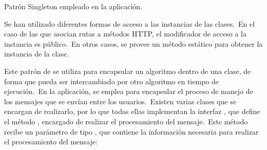 \begin{umlDiagram}
	\centering
	\scalebox{0.8} {
	}

	\caption{Patrón Singleton empleado en la aplicación.}
\end{umlDiagram}

Se han utilizado diferentes formas de acceso a las instancias de las clases.\ En el caso de las que asocian
rutas a métodos HTTP, el modificador de acceso a la instancia es público.\ En otros casos, se provee un método
estático para obtener la instancia de la clase.

Este patrón de  se utiliza para encapsular un algoritmo dentro de una clase, de forma que
pueda ser intercambiado por otro algoritmo en tiempo de ejecución.\ En la aplicación, se emplea para encapsular el
proceso de manejo de los mensajes que se envían entre los usuarios.\ Existen varias clases que se encargan de
realizarlo, por lo que todas ellas implementan la interfaz , que define el método
, encargado de realizar el procesamiento del mensaje.\ Este método recibe un
parámetro de tipo , que contiene la información necesaria para realizar el procesamiento
del mensaje:

